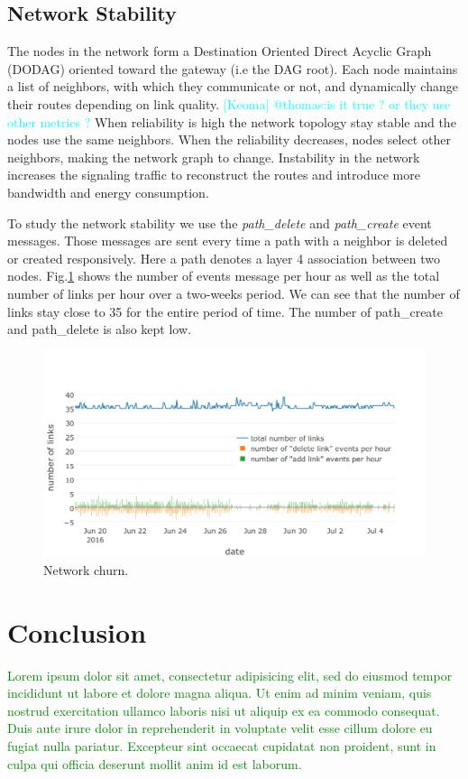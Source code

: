 \documentclass{sig-alternate}
\newcommand{\lorem}               {\textcolor{green}{Lorem ipsum dolor sit amet, consectetur adipisicing elit, sed do eiusmod tempor incididunt ut labore et dolore magna aliqua. Ut enim ad minim veniam, quis nostrud exercitation ullamco laboris nisi ut aliquip ex ea commodo consequat. Duis aute irure dolor in reprehenderit in voluptate velit esse cillum dolore eu fugiat nulla pariatur. Excepteur sint occaecat cupidatat non proident, sunt in culpa qui officia deserunt mollit anim id est laborum.}}
\newcommand{\keoma}[1]              {\textcolor{cyan}{[Keoma] #1}}
\begin{document}
\subsection{Network Stability}
\label{sec:net_stability}


The nodes in the network form a Destination Oriented Direct Acyclic Graph (DODAG) oriented toward the gateway (i.e the DAG root).
Each node maintains a list of neighbors, with which they communicate or not, and dynamically change their routes depending on link quality. \keoma{@thomas:is it true ? or they use other metrics ?}
When reliability is high the network topology stay stable and the nodes use the same neighbors.
When the reliability decreases, nodes select other neighbors, making the network graph to change.
Instability in the network increases the signaling traffic to reconstruct the routes and introduce more bandwidth and energy consumption.


To study the network stability we use the \textit{path\_delete} and \textit{path\_create} event messages.
Those messages are sent every time a path with a neighbor is deleted or created responsively.
Here a path denotes a layer 4 association between two nodes.
Fig.\ref{fig:net_churn} shows the number of events message per hour as well as the total number of links per hour over a two-weeks period.
We can see that the number of links stay close to 35 for the entire period of time.
The number of path\_create and path\_delete is also kept low.

\begin{figure}
    \centering
    \includegraphics[width=\columnwidth]{net_churn}
    \caption{Network churn.}
    \label{fig:net_churn}
\end{figure}


\section{Conclusion}
\label{sec:conclusion}


\lorem




\end{document}

